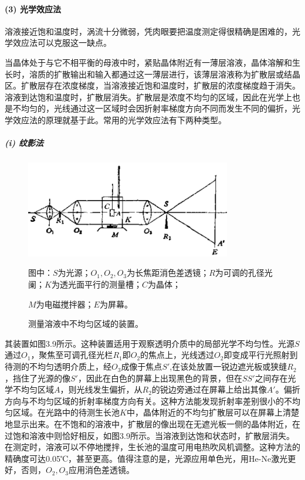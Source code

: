 \paragraph{(3) 光学效应法}
溶液接近饱和温度时，涡流十分微弱，凭肉眼要把温度测定得很精确是困难的，光学效应法可以克服这一缺点。

当晶体处于与它不相平衡的母液中时，紧贴晶体附近有一薄层溶液，晶体溶解和生长时，溶质的扩散输出和输入都通过这一薄层进行，该薄层溶液称为扩散层或结晶区。扩散层存在浓度梯度，当溶液接近饱和温度时，扩散层的浓度梯度趋于消失。溶液到达饱和温度时，扩散层消失。扩散层是浓度不均匀的区域，因此在光学上也是不均匀的，光线通过这一区域时会因折射率梯度方向不同而发生不同的偏折，光学效应法的原理就基于此。常用的光学效应法有下两种类型。

\subparagraph{(i) 纹影法}
\begin{figure}[htb]
 \centering
 \includegraphics[width=0.8\textwidth]{fig/cp03/img3.9.jpg}
 \caption{测量溶液中不均匀区域的装置。}图中：$S$为光源；$O_1,O_2,O_3$为长焦距消色差透镜；$R$为可调的孔径光阑；$K$为透光面平行的测量槽；$C$为晶体；
 
 $M$为电磁搅拌器；$E$为屏幕。
\end{figure}
其装置如图3.9所示。这种装置适用于观察透明介质中的局部光学不均匀性。光源$S$通过$O_1$，聚焦至可调孔径光栏$R_1$即$O_2$的焦点上，光线透过$O_2$即变成平行光照射到待测的不均匀透明介质上，经$O_3$成像于焦点$S'$,在该处放置一锐边遮光板或狭缝$R_2$，挡住了光源的像$S'$，因此在白色的屏幕上出现黑色的背景，但在$SS'$之间存在光学不均匀区域$A$，则光线发生偏折，从$R_2$的锐边旁通过在屏幕上给出其像$A'$。偏折方向与不均匀区域的折射率梯度方向有关。这种方法能发现折射率差别很小的不均匀区域。在光路中的待测生长池$K$中，晶体附近的不均匀扩散层可以在屏幕上清楚地显示出来。在不饱和的溶液中，扩散层的像出现在无遮光板一侧的晶体附近，在过饱和溶液中则恰好相反，如图3.9所示。当溶液到达饱和状态时，扩散层消失。在测定时，溶液可以不停地搅拌，生长池的温度可用电热吹风机调整。这种方法的精确度可达0.05℃，甚至更高。值得注意的是，光源应用单色光，用He-Ne激光更好，否则，$O_2,O_3$应用消色差透镜。

